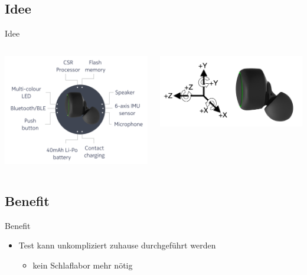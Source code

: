 \documentclass[18pt]{beamer}
\begin{document}
\subsection{Idee}
\begin{frame}{Idee}
    \begin{columns}[T] %
	\begin{column}{.48\textwidth}
	    \includegraphics[scale=0.15]{logos/esense}
	\end{column}%
	\hfill%
	\begin{column}{.48\textwidth}
	    \includegraphics[scale=0.25]{logos/esense2}
	\end{column}%
    \end{columns}
\end{frame}

\subsection{Benefit}
\begin{frame}{Benefit}
    \begin{itemize}
		\item Test kann unkompliziert zuhause durchgeführt werden
		\begin{itemize}
			\item kein Schlaflabor mehr nötig
		\end{itemize}
	\end{itemize}
\end{frame}
\end{document}
